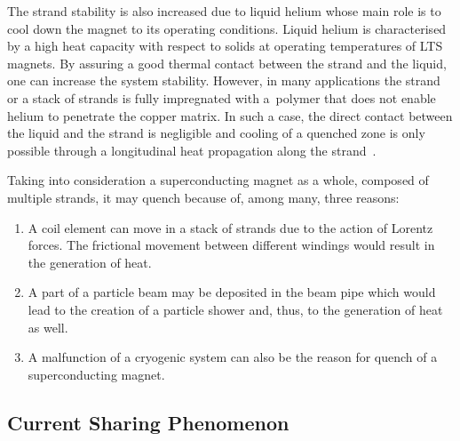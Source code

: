 The strand stability is also increased due to liquid helium whose main role is to cool down the magnet to its operating conditions. Liquid helium is characterised by a high heat capacity with respect to solids at operating temperatures of LTS magnets. By assuring a good thermal contact between the strand and the liquid, one can increase the system stability. However, in many applications the strand or a stack of strands is fully impregnated with a~polymer that does not enable helium to penetrate the copper matrix. In such a case, the direct contact between the liquid and the strand is negligible and cooling of a quenched zone is only possible through a longitudinal heat propagation along the strand~\cite[p.~122]{superconducting_accelerator_magnets}.

Taking into consideration a superconducting magnet as a whole, composed of multiple strands, it may quench because of, among many, three reasons: 
\begin{enumerate}
    \item A coil element can move in a stack of strands due to the action of Lorentz forces. The frictional movement between different windings would result in the generation of heat.
    \item A part of a particle beam may be deposited in the beam pipe which would lead to the creation of a particle shower and, thus, to the generation of heat as well. 
    \item A malfunction of a cryogenic system can also be the reason for quench of a superconducting magnet. 
\end{enumerate}

\subsection{Current Sharing Phenomenon}


